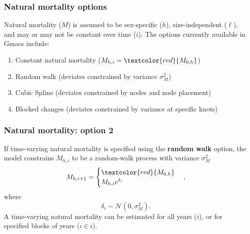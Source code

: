 \documentclass{beamer}
\begin{document}

\begin{frame}
\frametitle{Natural mortality options}
Natural mortality ($M$) is assumed to be sex-specific ($h$), size-independent
($\ell$), and may or may not be constant over time ($i$). The options currently
available in Gmacs include:
\begin{enumerate}
\item Constant natural mortality ($M_{h,i} = \textcolor{red}{M_{0,h}}$)
\item Random walk (deviates constrained by variance $\sigma^2_M$)
\item Cubic Spline (deviates constrained by nodes and node placement)
\item Blocked changes (deviates constrained by variance at specific knots)
\end{enumerate}
\end{frame}


\begin{frame}
\frametitle{Natural mortality: option 2}
If time-varying natural mortality is specified using the {\bf random walk}
option, the model constrains $M_{h,i}$ to be a random-walk process with variance
$\sigma^2_M$
\begin{equation*}
  M_{h,i+1} = 
  \begin{cases}
    \textcolor{red}{M_{0,h}} \\
    M_{h,i} e^{\delta_i}
  \end{cases},
\end{equation*}
where
\begin{equation*}
  \delta_i \sim \mathcal{N} \left( 0, \sigma^2_M \right).
\end{equation*}
A time-varying natural mortality can be estimated for all years ($i$), or for
specified blocks of years ($\iota \in i$).
\begin{figure}[!htbp]
  \centering
\end{figure}
\end{frame}

\end{document}

